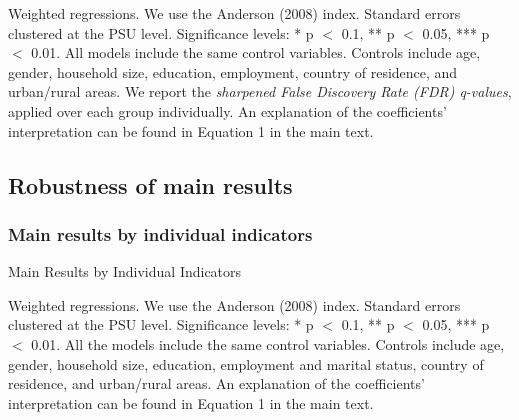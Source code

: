 \documentclass[a4paper,12pt]{article}
\renewcommand{\footnotesize}{\fontsize{8pt}{9pt}\selectfont}
\begin{document}
\begin{appendix}
\begin{table}[H]
\begin{threeparttable}
\begin{tablenotes}
	\footnotesize
	\item Weighted regressions. We use the Anderson (2008) index. Standard errors clustered at the PSU level.  Significance levels: * p $<$ 0.1, ** p $<$ 0.05, *** p $<$ 0.01. All models include the same control variables. Controls include age, gender, household size, education, employment, country of residence, and urban/rural areas.  We report the \cite{anderson2008multiple} \textit{sharpened False Discovery Rate (FDR) q-values}, applied over each group individually.  An explanation of the coefficients' interpretation can be found in Equation 1 in the main text.
\end{tablenotes}
\end{threeparttable}
\end{table} 


\vspace{10mm}

\subsection{Robustness of main results} \label{annex:main robust}

\subsubsection{Main results by individual indicators}

\begin{table}[H]
	\footnotesize
	\caption{Main Results by Individual Indicators}
	\label{tab:main_disagg}
	\centering
	\begin{threeparttable}

\begin{tablenotes}
	\footnotesize
	\item Weighted regressions. We use the Anderson (2008) index. Standard errors clustered at the PSU level. Significance levels: * p $<$ 0.1, ** p $<$ 0.05, *** p $<$ 0.01. All the models include the same control variables. Controls include age, gender, household size, education, employment and marital status, country of residence, and urban/rural areas. An explanation of the coefficients' interpretation can be found in Equation 1 in the main text.
\end{tablenotes}
\end{threeparttable}
\end{table} 



\end{appendix}
\end{document}
